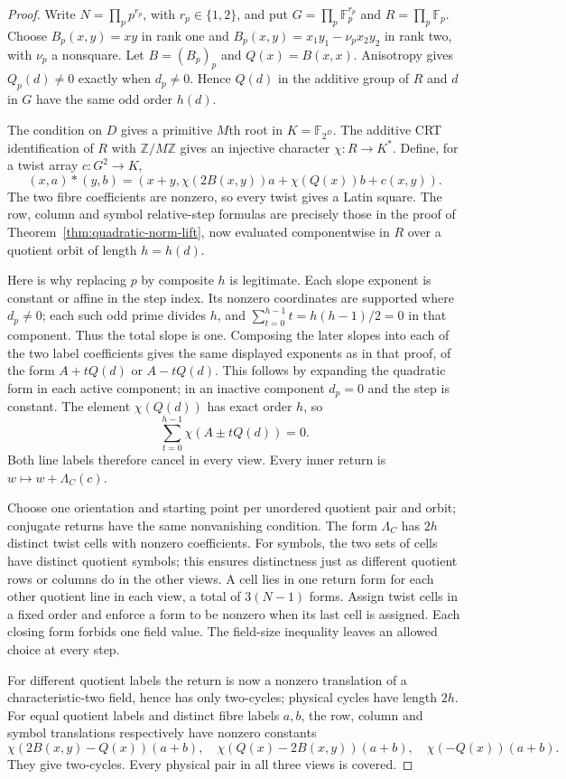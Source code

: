 \begin{proof}
Write $N=\prod_p p^{r_p}$, with $r_p\in\{1,2\}$, and put
$G=\prod_p\mathbb F_p^{r_p}$ and $R=\prod_p\mathbb F_p$.
Choose $B_p(x,y)=xy$ in rank one and
$B_p(x,y)=x_1y_1-\nu_px_2y_2$ in rank two, with $\nu_p$ a nonsquare.
Let $B=(B_p)_p$ and $Q(x)=B(x,x)$. Anisotropy gives
$Q_p(d)\ne0$ exactly when $d_p\ne0$. Hence $Q(d)$ in the additive
group of $R$ and $d$ in $G$ have the same odd order $h(d)$.

The condition on $D$ gives a primitive $M$th root in
$K=\mathbb F_{2^D}$. The additive CRT identification of $R$ with
$\mathbb Z/M\mathbb Z$ gives an injective character $\chi:R\to K^*$.
Define, for a twist array $c:G^2\to K$,
\[
 (x,a)*(y,b)=
 (x+y,\chi(2B(x,y))a+\chi(Q(x))b+c(x,y)).
\]
The two fibre coefficients are nonzero, so every twist gives a Latin
square. The row, column and symbol relative-step formulas are precisely
those in the proof of Theorem~\ref{thm:quadratic-norm-lift}, now evaluated
componentwise in $R$ over a quotient orbit of length $h=h(d)$.

Here is why replacing $p$ by composite $h$ is legitimate. Each slope
exponent is constant or affine in the step index. Its nonzero
coordinates are supported where $d_p\ne0$; each such odd prime divides
$h$, and $\sum_{t=0}^{h-1}t=h(h-1)/2=0$ in that component.
Thus the total slope is one. Composing the later slopes into each of
the two label coefficients gives the same displayed exponents as in
that proof, of the form $A+tQ(d)$ or $A-tQ(d)$. This follows by
expanding the quadratic form in each active component; in an inactive
component $d_p=0$ and the step is constant. The element $\chi(Q(d))$
has exact order $h$, so
\[
 \sum_{t=0}^{h-1}\chi(A\mathbin{\pm}tQ(d))=0.
\]
Both line labels therefore cancel in every view. Every inner return
is $w\mapsto w+\Lambda_C(c)$.

Choose one orientation and starting point per unordered quotient pair
and orbit; conjugate returns have the same nonvanishing condition.
The form $\Lambda_C$ has $2h$ distinct twist cells with nonzero
coefficients. For symbols, the two sets of cells have distinct
quotient symbols; this ensures distinctness just as different quotient
rows or columns do in the other views. A cell lies in one return form
for each other quotient line in each view, a total of $3(N-1)$ forms.
Assign twist cells in a fixed order and enforce a form to be nonzero
when its last cell is assigned. Each closing form forbids one field
value. The field-size inequality leaves an allowed choice at every step.

For different quotient labels the return is now a nonzero translation
of a characteristic-two field, hence has only two-cycles; physical
cycles have length $2h$. For equal quotient labels and distinct fibre
labels $a,b$, the row, column and symbol translations respectively have
nonzero constants
\[
 \chi(2B(x,y)-Q(x))(a+b),\quad
 \chi(Q(x)-2B(x,y))(a+b),\quad
 \chi(-Q(x))(a+b).
\]
They give two-cycles. Every physical pair in all three views is covered.
\end{proof}

